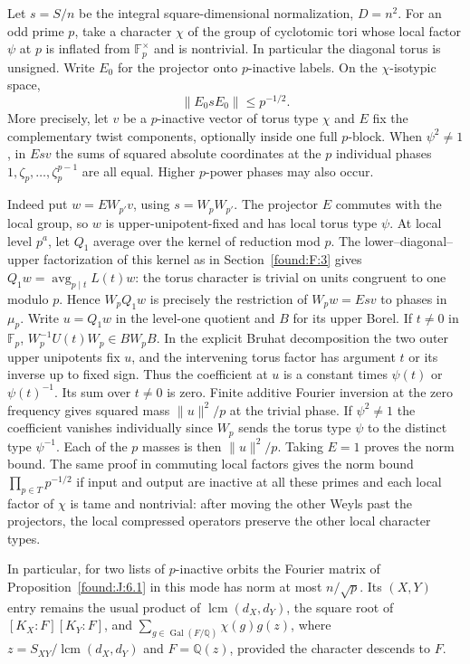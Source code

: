 \documentclass[11pt,a4paper]{article}
\numberwithin{equation}{section}
\theoremstyle{remark}
\begin{document}
Let $s=S/n$ be the integral square-dimensional normalization, $D=n^2$.
For an odd prime $p$, take a character $\chi$ of the group of cyclotomic tori whose local factor $\psi$ at $p$ is inflated from $\mathbb F_p^\times$ and is nontrivial. In particular the diagonal torus is unsigned. Write $E_0$ for the projector onto $p$-inactive labels. On the $\chi$-isotypic space,
\[
                    \|E_0s E_0\|\le p^{-1/2}.
\]
More precisely, let $v$ be a $p$-inactive vector of torus type $\chi$ and $E$ fix the complementary twist components, optionally inside one full $p$-block. When $\psi^2\ne1$, in $Esv$ the sums of squared absolute coordinates at the $p$ individual phases $1,\zeta_p,\dots,\zeta_p^{p-1}$ are all equal. Higher $p$-power phases may also occur.

Indeed put $w=EW_{p'}v$, using $s=W_pW_{p'}$. The projector $E$ commutes with the local group, so $w$ is upper-unipotent-fixed and has local torus type $\psi$. At local level $p^a$, let $Q_1$ average over the kernel of reduction mod $p$. The lower--diagonal--upper factorization of this kernel as in Section~\ref{found:F:3} gives $Q_1w=\operatorname{avg}_{p\mid t}L(t)w$: the torus character is trivial on units congruent to one modulo $p$. Hence $W_pQ_1w$ is precisely the restriction of $W_pw=Esv$ to phases in $\mu_p$. Write $u=Q_1w$ in the level-one quotient and $B$ for its upper Borel. If $t\ne0$ in $\mathbb F_p$, $W_p^{-1}U(t)W_p\in B W_p B$. In the explicit Bruhat decomposition the two outer upper unipotents fix $u$, and the intervening torus factor has argument $t$ or its inverse up to fixed sign. Thus the coefficient at $u$ is a constant times $\psi(t)$ or $\psi(t)^{-1}$. Its sum over $t\ne0$ is zero. Finite additive Fourier inversion at the zero frequency gives squared mass $\|u\|^2/p$ at the trivial phase. If $\psi^2\ne1$ the coefficient vanishes individually since $W_p$ sends the torus type $\psi$ to the distinct type $\psi^{-1}$. Each of the $p$ masses is then $\|u\|^2/p$. Taking $E=1$ proves the norm bound. The same proof in commuting local factors gives the norm bound $\prod_{p\in T}p^{-1/2}$ if input and output are inactive at all these primes and each local factor of $\chi$ is tame and nontrivial: after moving the other Weyls past the projectors, the local compressed operators preserve the other local character types.

In particular, for two lists of $p$-inactive orbits the Fourier matrix of Proposition~\ref{found:J:6.1} in this mode has norm at most $n/\sqrt p$. Its $(X,Y)$ entry remains the usual product of $\operatorname{lcm}(d_X,d_Y)$, the square root of $[K_X:F][K_Y:F]$, and $\sum_{g\in\operatorname{Gal}(F/\mathbb Q)}\chi(g)g(z)$, where $z=S_{XY}/\operatorname{lcm}(d_X,d_Y)$ and $F=\mathbb Q(z)$, provided the character descends to $F$.
\end{document}
